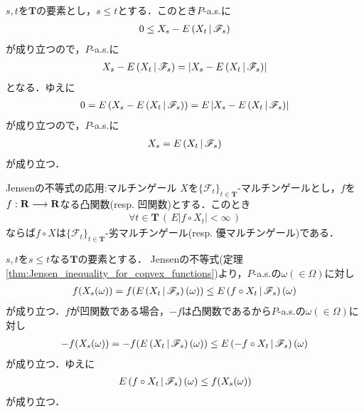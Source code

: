 	\begin{prf}
		$s,t$を$\mathbf{T}$の要素とし，$s \leq t$とする．このとき$P$-a.s.に
		\begin{align}
			0 \leq X_s - E\left( X_t \, \middle|\, \mathscr{F}_s \right)
		\end{align}
		が成り立つので，$P$-a.s.に
		\begin{align}
			X_s - E\left( X_t \, \middle|\, \mathscr{F}_s \right) = \left| X_s - E\left( X_t \, \middle|\, \mathscr{F}_s \right) \right|
		\end{align}
		となる．ゆえに
		\begin{align}
			0 = E\left(X_s - E\left( X_t \, \middle|\, \mathscr{F}_s \right)\right)
			= E\left| X_s - E\left( X_t \, \middle|\, \mathscr{F}_s \right) \right|
		\end{align}
		が成り立つので，$P$-a.s.に
		\begin{align}
			X_s = E\left( X_t \, \middle|\, \mathscr{F}_s \right)
		\end{align}
		が成り立つ．
		\QED
	\end{prf}
	
	\begin{itembox}[l]{Jensenの不等式の応用:マルチンゲール}
		$X$を$\{\mathscr{F}_t\}_{t \in \mathbf{T}}$-マルチンゲールとし，$f$を
		$f:\mathbf{R} \longrightarrow \mathbf{R}$なる凸関数(resp. 凹関数)とする．このとき
		\begin{align}
			\forall t \in \mathbf{T}\, (\, E|f \circ X_t| < \infty\, )
		\end{align}
		ならば$f \circ X$は$\{\mathscr{F}_t\}_{t \in \mathbf{T}}$-劣マルチンゲール(resp. 優マルチンゲール)である．
	\end{itembox}
	
	\begin{prf}
		$s,t$を$s \leq t$なる$\mathbf{T}$の要素とする．
		Jensenの不等式(定理\ref{thm:Jensen_inequality_for_convex_functions})より，$P$-a.s.の$\omega( \in \Omega)$に対し
		\begin{align}
			f(X_s(\omega)) = f(E\left( X_t \, \middle|\, \mathscr{F}_s \right)(\omega)) \leq E\left( f \circ X_t \, \middle|\, \mathscr{F}_s \right)(\omega)
		\end{align}
		が成り立つ．$f$が凹関数である場合，$-f$は凸関数であるから$P$-a.s.の$\omega( \in \Omega)$に対し
		\begin{align}
			-f(X_s(\omega)) = -f(E\left( X_t \, \middle|\, \mathscr{F}_s \right)(\omega)) \leq E\left( -f \circ X_t \, \middle|\, \mathscr{F}_s \right)(\omega)
		\end{align}
		が成り立つ．ゆえに
		\begin{align}
			E\left( f \circ X_t \, \middle|\, \mathscr{F}_s \right)(\omega) \leq f(X_s(\omega))
		\end{align}
		が成り立つ．
		\QED
	\end{prf}